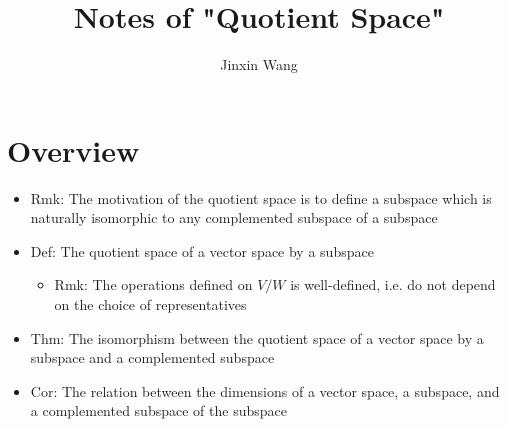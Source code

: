 \documentclass[onecolumn]{ctexart}
\title{Notes of "Quotient Space"}
\author{Jinxin Wang}
\date{}
\begin{document}
\maketitle

\section{Overview}
\begin{itemize}
  \item Rmk: The motivation of the quotient space is to define a subspace which is naturally isomorphic to any complemented subspace of a subspace
  \item Def: The quotient space of a vector space by a subspace
  \begin{itemize}
    \item Rmk: The operations defined on $V \slash W$ is well-defined, i.e. do not depend on the choice of representatives
  \end{itemize}
  \item Thm: The isomorphism between the quotient space of a vector space by a subspace and a complemented subspace
  \item Cor: The relation between the dimensions of a vector space, a subspace, and a complemented subspace of the subspace
\end{itemize}
\end{document}
